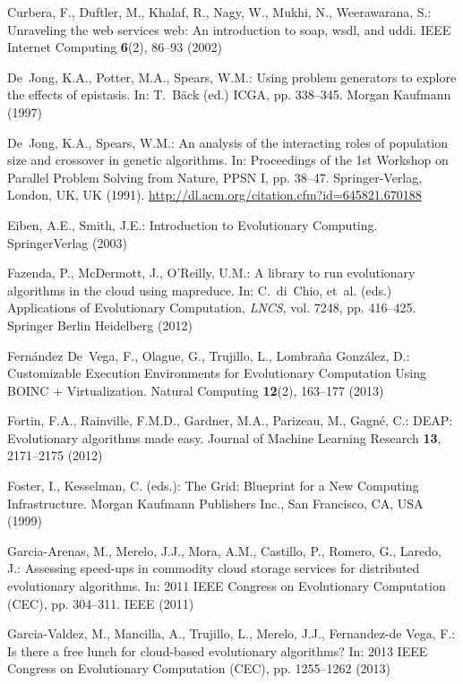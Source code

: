 \begin{thebibliography}{10}
Curbera, F., Duftler, M., Khalaf, R., Nagy, W., Mukhi, N., Weerawarana, S.:
  Unraveling the web services web: An introduction to soap, wsdl, and uddi.
\newblock IEEE Internet Computing \textbf{6}(2), 86--93 (2002)

De~Jong, K.A., Potter, M.A., Spears, W.M.: Using problem generators to explore
  the effects of epistasis.
\newblock In: T.~B\"ack (ed.) ICGA, pp. 338--345. Morgan Kaufmann (1997)

De~Jong, K.A., Spears, W.M.: An analysis of the interacting roles of population
  size and crossover in genetic algorithms.
\newblock In: Proceedings of the 1st Workshop on Parallel Problem Solving from
  Nature, PPSN I, pp. 38--47. Springer-Verlag, London, UK, UK (1991).
\newblock \urlprefix\url{http://dl.acm.org/citation.cfm?id=645821.670188}

Eiben, A.E., Smith, J.E.: Introduction to Evolutionary Computing.
\newblock SpringerVerlag (2003)

Fazenda, P., McDermott, J., O'Reilly, U.M.: A library to run evolutionary
  algorithms in the cloud using mapreduce.
\newblock In: C.~di~Chio, et~al. (eds.) Applications of Evolutionary
  Computation, \emph{LNCS}, vol. 7248, pp. 416--425. Springer Berlin Heidelberg
  (2012)

Fern\'{a}ndez De~Vega, F., Olague, G., Trujillo, L., Lombra\~{n}a Gonz\'{a}lez,
  D.: {Customizable Execution Environments for Evolutionary Computation Using
  BOINC + Virtualization}.
\newblock Natural Computing \textbf{12}(2), 163--177 (2013)

Fortin, F.A., Rainville, F.M.D., Gardner, M.A., Parizeau, M., Gagn\'e, C.:
  {DEAP}: Evolutionary algorithms made easy.
\newblock Journal of Machine Learning Research \textbf{13}, 2171--2175 (2012)

Foster, I., Kesselman, C. (eds.): The Grid: Blueprint for a New Computing
  Infrastructure.
\newblock Morgan Kaufmann Publishers Inc., San Francisco, CA, USA (1999)

Garcia-Arenas, M., Merelo, J.J., Mora, A.M., Castillo, P., Romero, G., Laredo,
  J.: Assessing speed-ups in commodity cloud storage services for distributed
  evolutionary algorithms.
\newblock In: 2011 IEEE Congress on Evolutionary Computation (CEC), pp.
  304--311. IEEE (2011)

Garcia-Valdez, M., Mancilla, A., Trujillo, L., Merelo, J.J., Fernandez-de Vega,
  F.: Is there a free lunch for cloud-based evolutionary algorithms?
\newblock In: 2013 IEEE Congress on Evolutionary Computation (CEC), pp.
  1255--1262 (2013)


\end{thebibliography}
